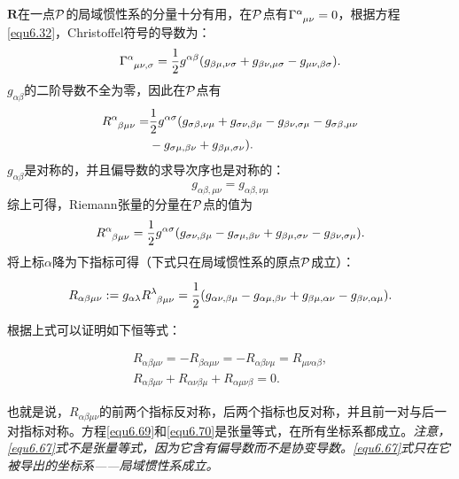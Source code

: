 $\bm{R}$在一点$\mathcal{P}$的局域惯性系的分量十分有用，在$\mathcal{P}$点有$\Gamma\indices{^\alpha_{\mu \nu}} = 0$，根据方程\eqref{equ6.32}，Christoffel符号的导数为：
\begin{equation}
    \Gamma\indices{^\alpha_{\mu \nu, \sigma}} = \frac{1}{2} g^{\alpha \beta} (g_{\beta \mu, \nu \sigma} + g_{\beta \nu, \mu \sigma} - g_{\mu \nu, \beta \sigma}).
\label{equ6.64}
\end{equation}
$g_{\alpha \beta}$的二阶导数不全为零，因此在$\mathcal{P}$点有
\begin{align}
    R\indices{^\alpha_{\beta \mu \nu}} =& \frac{1}{2} g^{\alpha \sigma} ( g_{\sigma \beta, \nu \mu} + g_{\sigma \nu, \beta \mu} - g_{\beta \nu, \sigma \mu} - g_{\sigma \beta, \mu \nu} \notag \\
    &- g_{\sigma \mu, \beta \nu} + g_{\beta \mu, \sigma \nu} ). \label{equ6.65}
\end{align}
$g_{\alpha \beta}$是对称的，并且偏导数的求导次序也是对称的：
\begin{equation}
    g_{\alpha \beta, \mu \nu} = g_{\alpha \beta, \nu \mu}
\label{equ6.66}
\end{equation}
综上可得，Riemann张量的分量在$\mathcal{P}$点的值为
\begin{equation}
    R\indices{^\alpha_{\beta \mu \nu}} = \frac{1}{2} g^{\alpha \sigma} (g_{\sigma \nu, \beta \mu} - g_{\sigma \mu, \beta \nu} + g_{\beta \mu, \sigma \nu} - g_{\beta \nu, \sigma \mu}).
\label{equ6.67}
\end{equation}
将上标$\alpha$降为下指标可得（下式只在局域惯性系的原点$\mathcal{P}$成立）：
\begin{shaded}
\begin{equation}
    R_{\alpha \beta \mu \nu} := g_{\alpha \lambda} R\indices{^\lambda_{\beta \mu \nu}} = \frac{1}{2} ( g_{\alpha \nu, \beta \mu} - g_{\alpha \mu, \beta \nu} + g_{\beta \mu, \alpha \nu} - g_{\beta \nu, \alpha \mu}).
\label{equ6.68}
\end{equation}
\end{shaded}
根据上式可以证明如下恒等式：
\begin{shaded}
\begin{align}
    R_{\alpha \beta \mu \nu} = -R_{\beta \alpha \mu \nu} = -R_{\alpha \beta \nu \mu} = R_{\mu \nu \alpha \beta}, \label{equ6.69} \\
    R_{\alpha \beta \mu \nu} + R_{\alpha \nu \beta \mu} + R_{\alpha \mu \nu \beta} = 0. \label{equ6.70}
\end{align}
\end{shaded}
也就是说，$R_{\alpha \beta \mu \nu}$的前两个指标反对称，后两个指标也反对称，并且前一对与后一对指标对称。方程\eqref{equ6.69}和\eqref{equ6.70}是张量等式，在所有坐标系都成立。\textit{注意，\eqref{equ6.67}式不是张量等式，因为它含有偏导数而不是协变导数。\eqref{equ6.67}式只在它被导出的坐标系——局域惯性系成立。}

